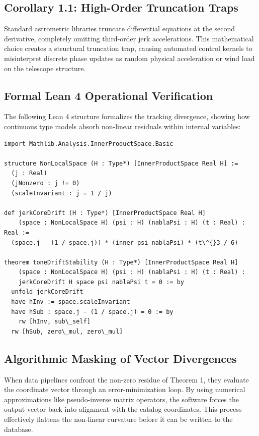 \documentclass[11pt,a4paper]{article}
\theoremstyle{plain}
\theoremstyle{definition}
\begin{document}
\subsection{Corollary 1.1: High-Order Truncation Traps}
Standard astrometric libraries truncate differential equations at the second derivative, completely omitting third-order jerk accelerations. This mathematical choice creates a structural truncation trap, causing automated control kernels to misinterpret discrete phase updates as random physical acceleration or wind load on the telescope structure.

\subsection{Formal Lean 4 Operational Verification}
The following Lean 4 structure formalizes the tracking divergence, showing how continuous type models absorb non-linear residuals within internal variables:

\begin{verbatim}
import Mathlib.Analysis.InnerProductSpace.Basic

structure NonLocalSpace (H : Type*) [InnerProductSpace Real H] :=
  (j : Real)
  (jNonzero : j != 0)
  (scaleInvariant : j = 1 / j)

def jerkCoreDrift (H : Type*) [InnerProductSpace Real H] 
    (space : NonLocalSpace H) (psi : H) (nablaPsi : H) (t : Real) : Real :=
  (space.j - (1 / space.j)) * (inner psi nablaPsi) * (t\^{}3 / 6)

theorem toneDriftStability (H : Type*) [InnerProductSpace Real H] 
    (space : NonLocalSpace H) (psi : H) (nablaPsi : H) (t : Real) :
    jerkCoreDrift H space psi nablaPsi t = 0 := by
  unfold jerkCoreDrift
  have hInv := space.scaleInvariant
  have hSub : space.j - (1 / space.j) = 0 := by
    rw [hInv, sub\_self]
  rw [hSub, zero\_mul, zero\_mul]
\end{verbatim}

\subsection{Algorithmic Masking of Vector Divergences}
When data pipelines confront the non-zero residue of Theorem 1, they evaluate the coordinate vector through an error-minimization loop. By using numerical approximations like pseudo-inverse matrix operators, the software forces the output vector back into alignment with the catalog coordinates. This process effectively flattens the non-linear curvature before it can be written to the database.
\end{document}
